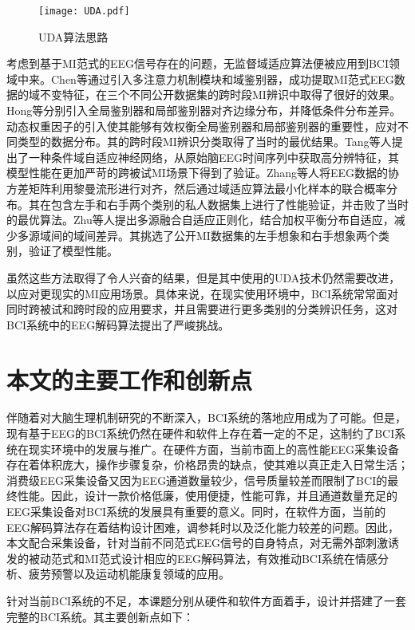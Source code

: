 \begin{figure}[!h]
	\centering
	\texttt{[image: UDA.pdf]}
	\caption{UDA算法思路\cite{1-94}}
	\label{fig1-11}
\end{figure}

考虑到基于MI范式的EEG信号存在的问题，无监督域适应算法便被应用到BCI领域中来。Chen等\cite{4-21}通过引入多注意力机制模块和域鉴别器，成功提取MI范式EEG数据的域不变特征，在三个不同公开数据集的跨时段MI辨识中取得了很好的效果。Hong等\cite{1-95}分别引入全局鉴别器和局部鉴别器对齐边缘分布，并降低条件分布差异。动态权重因子的引入使其能够有效权衡全局鉴别器和局部鉴别器的重要性，应对不同类型的数据分布。其的跨时段MI辨识分类取得了当时的最优结果。Tang等人\cite{1-96}提出了一种条件域自适应神经网络，从原始脑EEG时间序列中获取高分辨特征，其模型性能在更加严苛的跨被试MI场景下得到了验证。Zhang等人\cite{1-97}将EEG数据的协方差矩阵利用黎曼流形进行对齐，然后通过域适应算法最小化样本的联合概率分布。其在包含左手和右手两个类别的私人数据集上进行了性能验证，并击败了当时的最优算法。Zhu等人\cite{1-98}提出多源融合自适应正则化，结合加权平衡分布自适应，减少多源域间的域间差异。其挑选了公开MI数据集的左手想象和右手想象两个类别，验证了模型性能。

虽然这些方法取得了令人兴奋的结果，但是其中使用的UDA技术仍然需要改进，以应对更现实的MI应用场景。具体来说，在现实使用环境中，BCI系统常常面对同时跨被试和跨时段的应用要求，并且需要进行更多类别的分类辨识任务，这对BCI系统中的EEG解码算法提出了严峻挑战。



\section{本文的主要工作和创新点}
伴随着对大脑生理机制研究的不断深入，BCI系统的落地应用成为了可能。但是，现有基于EEG的BCI系统仍然在硬件和软件上存在着一定的不足，这制约了BCI系统在现实环境中的发展与推广。在硬件方面，当前市面上的高性能EEG采集设备存在着体积庞大，操作步骤复杂，价格昂贵的缺点，使其难以真正走入日常生活；消费级EEG采集设备又因为EEG通道数量较少，信号质量较差而限制了BCI的最终性能。因此，设计一款价格低廉，使用便捷，性能可靠，并且通道数量充足的EEG采集设备对BCI系统的发展具有重要的意义。同时，在软件方面，当前的EEG解码算法存在着结构设计困难，调参耗时以及泛化能力较差的问题。因此，本文配合采集设备，针对当前不同范式EEG信号的自身特点，对无需外部刺激诱发的被动范式和MI范式设计相应的EEG解码算法，有效推动BCI系统在情感分析、疲劳预警以及运动机能康复领域的应用。

针对当前BCI系统的不足，本课题分别从硬件和软件方面着手，设计并搭建了一套完整的BCI系统。其主要创新点如下：


